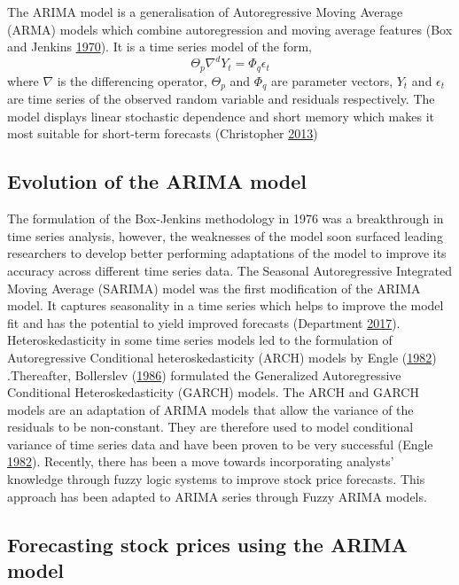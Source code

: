 \documentclass[12pt,preprint, authoryear]{elsarticle}
\numberwithin{equation}{section}
\numberwithin{figure}{section}
\numberwithin{table}{section}
\begin{document}
The ARIMA model is a generalisation of Autoregressive Moving Average
(ARMA) models which combine autoregression and moving average features
(Box and Jenkins \protect\hyperlink{ref-box1970time}{1970}). It is a
time series model of the form,
\[ \Theta_p \nabla^d Y_t = \Phi_q \epsilon_t \] where \(\nabla\) is the
differencing operator, \(\Theta_p\) and \(\Phi_q\) are parameter
vectors, \(Y_t\) and \(\epsilon_t\) are time series of the observed
random variable and residuals respectively. The model displays linear
stochastic dependence and short memory which makes it most suitable for
short-term forecasts (Christopher \protect\hyperlink{ref-Baum}{2013})

\subsection{Evolution of the ARIMA
model}\label{evolution-of-the-arima-model}

The formulation of the Box-Jenkins methodology in 1976 was a
breakthrough in time series analysis, however, the weaknesses of the
model soon surfaced leading researchers to develop better performing
adaptations of the model to improve its accuracy across different time
series data. The Seasonal Autoregressive Integrated Moving Average
(SARIMA) model was the first modification of the ARIMA model. It
captures seasonality in a time series which helps to improve the model
fit and has the potential to yield improved forecasts (Department
\protect\hyperlink{ref-PennState2017}{2017}). Heteroskedasticity in some
time series models led to the formulation of Autoregressive Conditional
heteroskedasticity (ARCH) models by Engle
(\protect\hyperlink{ref-engle1982autoregressive}{1982}) .Thereafter,
Bollerslev (\protect\hyperlink{ref-bollerslev1986generalized}{1986})
formulated the Generalized Autoregressive Conditional Heteroskedasticity
(GARCH) models. The ARCH and GARCH models are an adaptation of ARIMA
models that allow the variance of the residuals to be non-constant. They
are therefore used to model conditional variance of time series data and
have been proven to be very successful (Engle
\protect\hyperlink{ref-engle1982autoregressive}{1982}). Recently, there
has been a move towards incorporating analysts' knowledge through fuzzy
logic systems to improve stock price forecasts. This approach has been
adapted to ARIMA series through Fuzzy ARIMA models.

\subsection{Forecasting stock prices using the ARIMA
model}\label{forecasting-stock-prices-using-the-arima-model}
\end{document}
